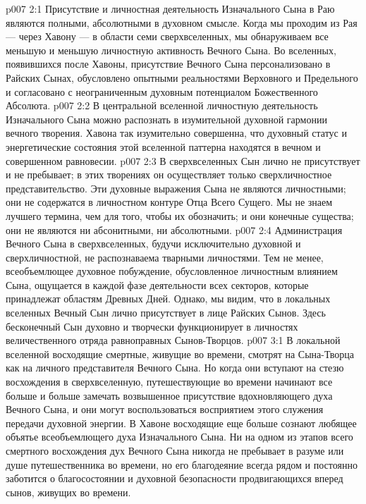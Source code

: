 \vs p007 2:1 Присутствие и личностная деятельность Изначального Сына в Раю являются полными, абсолютными в духовном смысле. Когда мы проходим из Рая --- через Хавону --- в области семи сверхвселенных, мы обнаруживаем все меньшую и меньшую личностную активность Вечного Сына. Во вселенных, появившихся после Хавоны, присутствие Вечного Сына персонализовано в Райских Сынах, обусловлено опытными реальностями Верховного и Предельного и согласовано с неограниченным духовным потенциалом Божественного Абсолюта.
\vs p007 2:2 В центральной вселенной личностную деятельность Изначального Сына можно распознать в изумительной духовной гармонии вечного творения. Хавона так изумительно совершенна, что духовный статус и энергетические состояния этой вселенной паттерна находятся в вечном и совершенном равновесии.
\vs p007 2:3 В сверхвселенных Сын лично не присутствует и не пребывает; в этих творениях он осуществляет только сверхличностное представительство. Эти духовные выражения Сына не являются личностными; они не содержатся в личностном контуре Отца Всего Сущего. Мы не знаем лучшего термина, чем  для того, чтобы их обозначить; и они конечные существа; они не являются ни абсонитными, ни абсолютными.
\vs p007 2:4 Администрация Вечного Сына в сверхвселенных, будучи исключительно духовной и сверхличностной, не распознаваема тварными личностями. Тем не менее, всеобъемлющее духовное побуждение, обусловленное личностным влиянием Сына, ощущается в каждой фазе деятельности всех секторов, которые принадлежат областям Древных Дней. Однако, мы видим, что в локальных вселенных Вечный Сын лично присутствует в лице Райских Сынов. Здесь бесконечный Сын духовно и творчески функционирует в личностях величественного отряда равноправных Сынов\hyp{}Творцов.
\vs p007 3:1 В локальной вселенной восходящие смертные, живущие во времени, смотрят на Сына\hyp{}Творца как на личного представителя Вечного Сына. Но когда они вступают на стезю восхождения в сверхвселенную, путешествующие во времени начинают все больше и больше замечать возвышенное присутствие вдохновляющего духа Вечного Сына, и они могут воспользоваться восприятием этого служения передачи духовной энергии. В Хавоне восходящие еще больше сознают любящее объятье всеобъемлющего духа Изначального Сына. Ни на одном из этапов всего смертного восхождения дух Вечного Сына никогда не пребывает в разуме или душе путешественника во времени, но его благодеяние всегда рядом и постоянно заботится о благосостоянии и духовной безопасности продвигающихся вперед сынов, живущих во времени.
